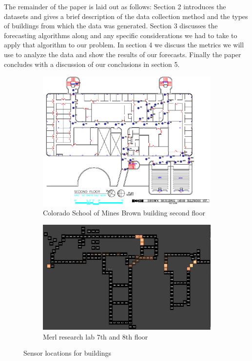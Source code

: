 \documentclass{acm_proc_article-sp}
\begin{document}
The remainder of the paper is laid out as follows: Section 2 introduces the datasets and gives a brief description of the data collection method and the types of buildings from which the data was generated.  Section 3 discusses the forecasting algorithms along and any specific considerations we had to take to apply that algorithm to our problem.  In section 4 we discuss the metrics we will use to analyze the data and show the results of our forecasts.  Finally the paper concludes with a discussion of our conclusions in section 5.

\begin{figure}[t!]
\centering
\begin{subfigure}{.45\textwidth}
  \centering
  \includegraphics[width=.8\linewidth]{bb_floor2_sensors_old.png}
  \caption{Colorado School of Mines Brown building second floor}
  \label{fig:sub1}
\end{subfigure}
\begin{subfigure}{.45\textwidth}
  \centering
  \includegraphics[width=.8\linewidth]{merl_map.png}
  \caption{Merl research lab 7th and 8th floor}
  \label{fig:sub2}
\end{subfigure}
\caption{Sensor locations for buildings}
\label{fig:test}
\end{figure}
\end{document}
